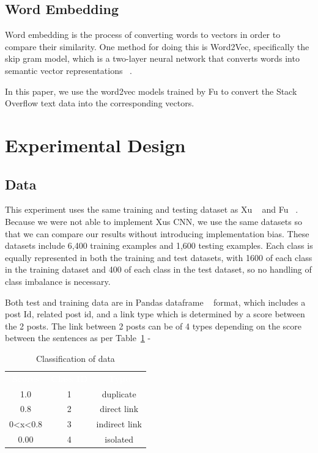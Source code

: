 \documentclass[sigconf]{acmart}
\theoremstyle{break}
\begin{document}
    \subsection{Word Embedding}
    \label{sssec:Word Embedding}
    Word embedding is the process of converting words to vectors in order to compare their similarity. One method for doing this is Word2Vec, specifically the skip gram model, which is a two-layer neural network that converts words into semantic vector representations ~\cite{mikolov2013distributed}.
    
    In this paper, we use the word2vec models trained by Fu to convert the Stack Overflow text data into the corresponding vectors.



\section{Experimental Design}
\label{sect: Experimental Design}
    \subsection{Data}
    \label{sssec:Data}
    This experiment uses the same training and testing dataset as Xu ~\cite{xu2016predicting} and Fu ~\cite{fu2017easy}. Because we were not able to implement Xu\textquotesingle s CNN, we use the same datasets so that we can compare our results without introducing implementation bias. These datasets include 6,400 training examples and 1,600 testing examples. Each class is equally represented in both the training and test datasets, with 1600 of each class in the training dataset and 400 of each class in the test dataset, so no handling of class imbalance is necessary.
    
    Both test and training data are in Pandas dataframe ~\cite{mckinney2011pandas} format, which includes a post Id, related post id, and a link type which is determined by a score between the 2 posts. The link between 2 posts can be of 4 types depending on the score between the sentences as per Table~\ref{tab:data_classl} - 
    
    \begin{table}[h!]
        \centering
        \begin{tabular}{c|c|c}
            \rowcolor{darkgray} \textcolor{white}{\textbf{Scores}} & \textcolor{white}{\textbf{Class ID}} & \textcolor{white}{\textbf{Type}} \\
            1.0 & 1 & duplicate  \\
            \rowcolor{lightgray} 0.8 & 2 & direct link \\
            0<x<0.8 & 3 & indirect link \\
            \rowcolor{lightgray} 0.00 & 4 & isolated \\
        \end{tabular}
        \caption{Classification of data}
        \label{tab:data_classl}
    \end{table}
    
\end{document}
